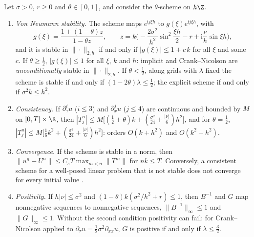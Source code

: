 \begin{theorem}\label{thm:fd-schemes}
Let $\sigma>0$, $r\ge0$ and $\theta\in[0,1]$, and consider the $\theta$-scheme on $h\Z$.
\begin{enumerate}[label=(\roman*)]
  \item \emph{Von Neumann stability.} The scheme maps $e^{\mathrm i j\xi h}$ to $g(\xi)e^{\mathrm i j\xi h}$, with
    \begin{equation}\label{eq:fd-symbol}
      g(\xi)=\frac{1+(1-\theta)z}{1-\theta z},\qquad
      z=k\Big(-\frac{2\sigma^2}{h^2}\sin^2\frac{\xi h}2-r+\mathrm i\frac{\nu}{h}\sin\xi h\Big),
    \end{equation}
    and it is stable in $\|\cdot\|_{2,h}$ if and only if $|g(\xi)|\le1+c\,k$ for all $\xi$ and some $c$. If
    $\theta\ge\frac12$, $|g(\xi)|\le1$ for all $\xi$, $k$ and $h$: implicit and Crank--Nicolson are
    \emph{unconditionally} stable in $\|\cdot\|_{2,h}$. If $\theta<\frac12$, along grids with $\lambda$ fixed the
    scheme is stable if and only if $(1-2\theta)\lambda\le\frac12$; the explicit scheme if and only if
    $\sigma^2k\le h^2$.
  \item \emph{Consistency.} If $\partial^i_\tau u$ ($i\le3$) and $\partial^j_xu$ ($j\le4$) are continuous and bounded by $M$
    on $[0,T]\times\R$, then
    $|T^n_j|\le M\big[(\frac12+\theta)k+(\frac{\sigma^2}{24}+\frac{|\nu|}6)h^2\big]$, and for $\theta=\frac12$,
    $|T^n_j|\le M\big[\frac16k^2+(\frac{\sigma^2}{24}+\frac{|\nu|}6)h^2\big]$: orders $O(k+h^2)$ and $O(k^2+h^2)$.
  \item \emph{Convergence.} If the scheme is stable in a norm, then
    $\|u^n-U^n\|\le C_sT\max_{m<n}\|T^m\|$ for $nk\le T$. Conversely, a consistent scheme for a well-posed
    linear problem that is not stable does not converge for every initial value
    \citep{lax-richtmyer-1956}.
  \item \emph{Positivity.} If $h|\nu|\le\sigma^2$ and $(1-\theta)k(\sigma^2/h^2+r)\le1$, then $B^{-1}$ and $G$ map
    nonnegative sequences to nonnegative sequences, $\|B^{-1}\|_\infty\le1$ and $\|G\|_\infty\le1$. Without
    the second condition positivity can fail: for Crank--Nicolson applied to
    $\partial_\tau u=\frac12\sigma^2\partial_{xx}u$, $G$ is positive if and only if $\lambda\le\frac32$.
\end{enumerate}
\end{theorem}

